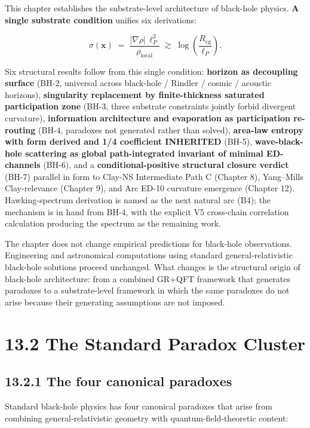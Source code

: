 \documentclass[11pt]{book}
\begin{document}
This chapter establishes the substrate-level architecture of black-hole physics. \textbf{A single substrate condition} unifies six derivations:

\[
\sigma(\mathbf{x}) \;=\; \frac{|\nabla\rho|\,\ell_P^2}{\rho_\mathrm{local}} \;\gtrsim\; \log\!\left(\frac{R_\mathrm{cg}}{\ell_P}\right).
\]

Six structural results follow from this single condition: \textbf{horizon as decoupling surface} (BH-2, universal across black-hole / Rindler / cosmic / acoustic horizons), \textbf{singularity replacement by finite-thickness saturated participation zone} (BH-3, three substrate constraints jointly forbid divergent curvature), \textbf{information architecture and evaporation as participation re-routing} (BH-4, paradoxes not generated rather than solved), \textbf{area-law entropy with form derived and 1/4 coefficient INHERITED} (BH-5), \textbf{wave-black-hole scattering as global path-integrated invariant of minimal ED-channels} (BH-6), and a \textbf{conditional-positive structural closure verdict} (BH-7) parallel in form to Clay-NS Intermediate Path C (Chapter 8), Yang–Mills Clay-relevance (Chapter 9), and Arc ED-10 curvature emergence (Chapter 12). Hawking-spectrum derivation is named as the next natural arc (B4); the mechanism is in hand from BH-4, with the explicit V5 cross-chain correlation calculation producing the spectrum as the remaining work.

The chapter does not change empirical predictions for black-hole observations. Engineering and astronomical computations using standard general-relativistic black-hole solutions proceed unchanged. What changes is the structural origin of black-hole architecture: from a combined GR+QFT framework that generates paradoxes to a substrate-level framework in which the same paradoxes do not arise because their generating assumptions are not imposed.

\section{13.2 The Standard Paradox Cluster}

\subsection{13.2.1 The four canonical paradoxes}

Standard black-hole physics has four canonical paradoxes that arise from combining general-relativistic geometry with quantum-field-theoretic content:
\end{document}

